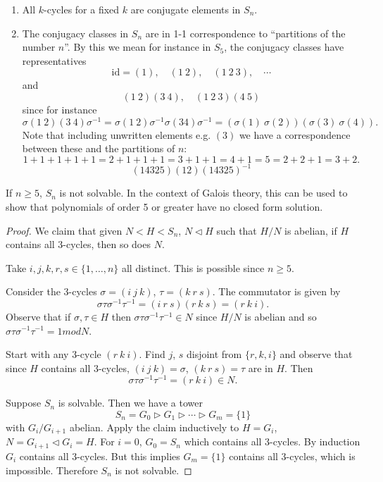 \begin{corol}
\begin{enumerate}
  \item{
    All $k$-cycles for a fixed $k$ are conjugate elements in $S_n$.
  }
  \item{
    The conjugacy classes in $S_n$ are in 1-1 correspondence to
    ``partitions of the number $n$''. By this we mean for instance in
    $S_5$, the conjugacy classes have representatives
    $$
    \mathrm{id} = (1), \quad
    (1 ~ 2),           \quad
    (1 ~ 2 ~ 3),       \quad
    \cdots
    $$
    and
    $$
    (1 ~ 2) (3 ~ 4), \quad
    (1 ~ 2 ~ 3)(4 ~ 5)
    $$
    since for instance
    $$
    \sigma (1~2) (3~4) \sigma^{-1}
  = \sigma (1~2) \sigma^{-1} \sigma (34) \sigma^{-1}
  = (\sigma(1) ~ \sigma(2))(\sigma(3) ~ \sigma(4)).
    $$
    Note that including unwritten elements e.g. $(3)$ we have a
    correspondence between these and the partitions of $n$:
    $$
    1 + 1 + 1 + 1 + 1
  = 2 + 1 + 1 + 1
  = 3 + 1 + 1
  = 4 + 1
  = 5
  = 2 + 2 + 1
  = 3 + 2.
    $$
    $$
    (14325)(12)(14325)^{-1}
    $$

  }
\end{enumerate}
\end{corol}

\begin{prop}
If $n \geq 5$, $S_n$ is not solvable. In the context of Galois theory,
this can be used to show that polynomials of order 5 or greater have
no closed form solution.
\end{prop}

\begin{proof}
We claim that given $N < H < S_n$, $N \triangleleft
H$ such that $H / N$ is abelian,
if $H$ contains all 3-cycles, then so does $N$.

Take $i, j, k, r, s \in \{1, \dots, n\}$ all distinct. This is
possible since $n \geq 5$.

Consider the 3-cycles $\sigma = (i~j~k)$, $\tau = (k~r~s)$. The
commutator is given by
$$
  \sigma \tau \sigma^{-1} \tau^{-1}
= (i~r~s)(r~k~s) = (r~k~i).
$$
Observe that if $\sigma, \tau \in H$ then
$\sigma \tau \sigma^{-1} \tau^{-1} \in N$ since $H / N$ is abelian and
so $\sigma \tau \sigma^{-1} \tau^{-1} = 1 mod N$.

Start with any 3-cycle $(r~k~i)$. Find $j$, $s$ disjoint from
$\{r, k, i\}$ and observe that since $H$ contains all 3-cycles,
$(i~j~k) = \sigma$, $(k~r~s) = \tau$ are in $H$. Then
$$
\sigma \tau \sigma^{-1} \tau^{-1} = (r~k~i) \in N.
$$

Suppose $S_n$ is solvable. Then we have a tower
$$
S_n =                G_0
      \triangleright G_1
      \triangleright \cdots
      \triangleright G_m = \{1\}
$$
with $G_i / G_{i+1}$ abelian. Apply the claim inductively to $H =
G_i$, $N = G_{i+1} \triangleleft G_i = H$. For $i = 0$,
$G_0 = S_n$ which contains all 3-cycles. By induction $G_i$ contains
all 3-cycles. But this implies $G_m = \{ 1 \}$ contains all 3-cycles,
which is impossible. Therefore $S_n$ is not solvable.
\end{proof}

